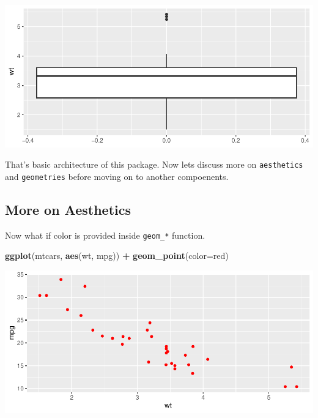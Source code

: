 \documentclass[
]{book}
\newenvironment{Shaded}{\begin{snugshade}}{\end{snugshade}}
\newcommand{\AttributeTok}[1]{\textcolor[rgb]{0.13,0.29,0.53}{#1}}
\newcommand{\FunctionTok}[1]{\textcolor[rgb]{0.13,0.29,0.53}{\textbf{#1}}}
\newcommand{\NormalTok}[1]{#1}
\newcommand{\SpecialCharTok}[1]{\textcolor[rgb]{0.81,0.36,0.00}{\textbf{#1}}}
\newcommand{\StringTok}[1]{\textcolor[rgb]{0.31,0.60,0.02}{#1}}
\begin{document}
\begin{center}\includegraphics{DauR_files/figure-latex/fig_4-1} \end{center}

That's basic architecture of this package. Now lets discuss more on \texttt{aesthetics} and \texttt{geometries} before moving on to another compoenents.

\hypertarget{more-on-aesthetics}{%
\subsection{More on Aesthetics}\label{more-on-aesthetics}}

Now what if color is provided inside \texttt{geom\_*} function.

\begin{Shaded}
\begin{Highlighting}[]
\FunctionTok{ggplot}\NormalTok{(mtcars, }\FunctionTok{aes}\NormalTok{(wt, mpg)) }\SpecialCharTok{+}
  \FunctionTok{geom\_point}\NormalTok{(}\AttributeTok{color=}\StringTok{\textquotesingle{}red\textquotesingle{}}\NormalTok{)}
\end{Highlighting}
\end{Shaded}

\begin{center}\includegraphics{DauR_files/figure-latex/fig_5-1} \end{center}
\end{document}
